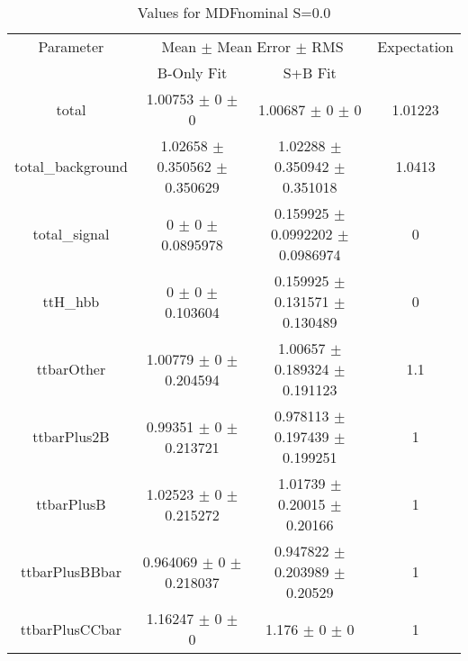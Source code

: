 \begin{table}
\centering
\caption{Values for MDFnominal S=0.0}
\begin{tabular}{cccc}
\toprule
Parameter & \multicolumn{2}{c}{Mean $\pm$ Mean Error $\pm$ RMS} & Expectation\\
 & B-Only Fit & S+B Fit & \\
\midrule
total & \num{1.00753} $\pm$ \num{0} $\pm$ \num{0} & \num{1.00687} $\pm$ \num{0} $\pm$ \num{0} & \num{1.01223}\\
total\_background & \num{1.02658} $\pm$ \num{0.350562} $\pm$ \num{0.350629} & \num{1.02288} $\pm$ \num{0.350942} $\pm$ \num{0.351018} & \num{1.0413}\\
total\_signal & \num{0} $\pm$ \num{0} $\pm$ \num{0.0895978} & \num{0.159925} $\pm$ \num{0.0992202} $\pm$ \num{0.0986974} & \num{0}\\
ttH\_hbb & \num{0} $\pm$ \num{0} $\pm$ \num{0.103604} & \num{0.159925} $\pm$ \num{0.131571} $\pm$ \num{0.130489} & \num{0}\\
ttbarOther & \num{1.00779} $\pm$ \num{0} $\pm$ \num{0.204594} & \num{1.00657} $\pm$ \num{0.189324} $\pm$ \num{0.191123} & \num{1.1}\\
ttbarPlus2B & \num{0.99351} $\pm$ \num{0} $\pm$ \num{0.213721} & \num{0.978113} $\pm$ \num{0.197439} $\pm$ \num{0.199251} & \num{1}\\
ttbarPlusB & \num{1.02523} $\pm$ \num{0} $\pm$ \num{0.215272} & \num{1.01739} $\pm$ \num{0.20015} $\pm$ \num{0.20166} & \num{1}\\
ttbarPlusBBbar & \num{0.964069} $\pm$ \num{0} $\pm$ \num{0.218037} & \num{0.947822} $\pm$ \num{0.203989} $\pm$ \num{0.20529} & \num{1}\\
ttbarPlusCCbar & \num{1.16247} $\pm$ \num{0} $\pm$ \num{0} & \num{1.176} $\pm$ \num{0} $\pm$ \num{0} & \num{1}\\
\bottomrule
\end{tabular}
\end{table}